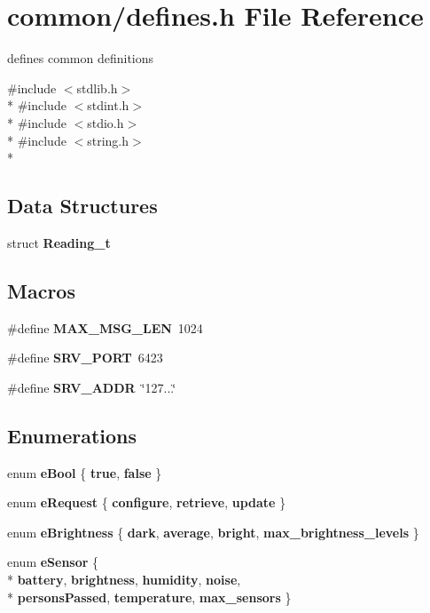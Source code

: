 \section{common/defines.h File Reference}
\label{defines_8h}


defines common definitions  


{\ttfamily \#include $<$stdlib.\-h$>$}\\*
{\ttfamily \#include $<$stdint.\-h$>$}\\*
{\ttfamily \#include $<$stdio.\-h$>$}\\*
{\ttfamily \#include $<$string.\-h$>$}\\*
\subsection*{Data Structures}
\begin{DoxyCompactItemize}
\item 
struct {\bf Reading\-\_\-t}
\end{DoxyCompactItemize}
\subsection*{Macros}
\begin{DoxyCompactItemize}
\item 
\#define {\bf M\-A\-X\-\_\-\-M\-S\-G\-\_\-\-L\-E\-N}~1024
\item 
\#define {\bf S\-R\-V\-\_\-\-P\-O\-R\-T}~6423
\item 
\#define {\bf S\-R\-V\-\_\-\-A\-D\-D\-R}~\char`\"{}127...\char`\"{}
\end{DoxyCompactItemize}
\subsection*{Enumerations}
\begin{DoxyCompactItemize}
\item 
enum {\bf e\-Bool} \{ {\bf true}, 
{\bf false}
 \}
\item 
enum {\bf e\-Request} \{ {\bf configure}, 
{\bf retrieve}, 
{\bf update}
 \}
\item 
enum {\bf e\-Brightness} \{ {\bf dark}, 
{\bf average}, 
{\bf bright}, 
{\bf max\-\_\-brightness\-\_\-levels}
 \}
\item 
enum {\bf e\-Sensor} \{ \\*
{\bf battery}, 
{\bf brightness}, 
{\bf humidity}, 
{\bf noise}, 
\\*
{\bf persons\-Passed}, 
{\bf temperature}, 
{\bf max\-\_\-sensors}
 \}
\end{DoxyCompactItemize}
